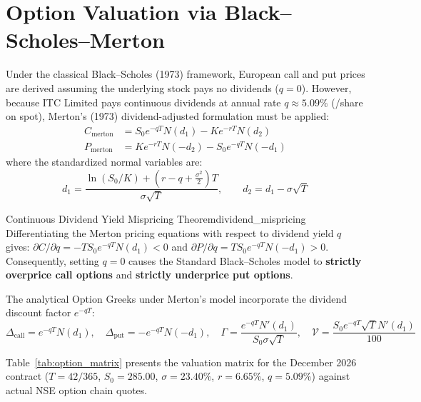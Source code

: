 
\section{Option Valuation via Black--Scholes--Merton}
\label{sec:black_scholes}

Under the classical Black--Scholes (1973) framework, European call and put prices are derived assuming the underlying stock pays no dividends ($q = 0$). However, because ITC Limited pays continuous dividends at annual rate $q \approx 5.09\%$ (/share on  spot), Merton's (1973) dividend-adjusted formulation must be applied:
\begin{align}
C_{\text{merton}} &= S_0 e^{-q T} N(d_1) - K e^{-r T} N(d_2) \label{eq:bs_call} \\
P_{\text{merton}} &= K e^{-r T} N(-d_2) - S_0 e^{-q T} N(-d_1) \label{eq:bs_put}
\end{align}
where the standardized normal variables are:
\begin{equation}
d_1 = \frac{\ln(S_0 / K) + \left(r - q + \frac{\sigma^2}{2}\right)T}{\sigma \sqrt{T}}, \qquad d_2 = d_1 - \sigma \sqrt{T}
\label{eq:d1_d2}
\end{equation}

\begin{theorem}{Continuous Dividend Yield Mispricing Theorem}{dividend_mispricing}
Differentiating the Merton pricing equations with respect to dividend yield $q$ gives: $\partial C / \partial q = -T S_0 e^{-q T} N(d_1) < 0$ and $\partial P / \partial q = T S_0 e^{-q T} N(-d_1) > 0$. Consequently, setting $q = 0$ causes the Standard Black--Scholes model to \textbf{strictly overprice call options} and \textbf{strictly underprice put options}.
\end{theorem}

The analytical Option Greeks under Merton's model incorporate the dividend discount factor $e^{-qT}$:
\begin{equation}
\Delta_{\text{call}} = e^{-q T} N(d_1), \quad \Delta_{\text{put}} = -e^{-q T} N(-d_1), \quad \Gamma = \frac{e^{-q T} N'(d_1)}{S_0 \sigma \sqrt{T}}, \quad \mathcal{V} = \frac{S_0 e^{-q T} \sqrt{T} N'(d_1)}{100}
\end{equation}

Table~\ref{tab:option_matrix} presents the valuation matrix for the December 2026 contract ($T = 42/365$, $S_0 = 285.00$, $\sigma = 23.40\%$, $r = 6.65\%$, $q = 5.09\%$) against actual NSE option chain quotes.


